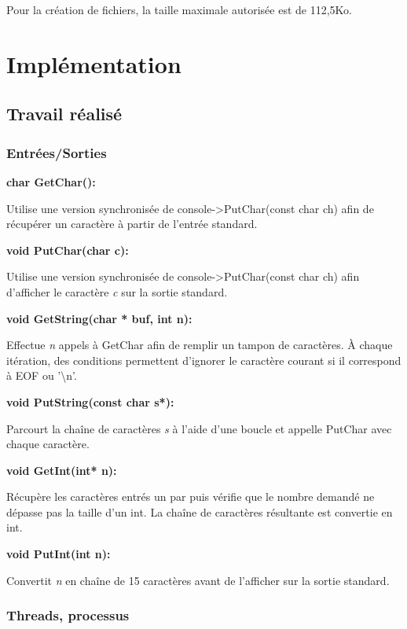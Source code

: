 \documentclass[12pt]{report}
\begin{document}
Pour la création de fichiers, la taille maximale autorisée est de 112,5Ko.


\chapter{Implémentation}

\section{Travail réalisé}

\subsection{Entrées/Sorties}

\textbf{char GetChar():} 

Utilise une version synchronisée de console->PutChar(const char ch)
afin de récupérer un caractère à partir de l'entrée standard.

\bigskip

\textbf{void PutChar(char c):} 

Utilise une version synchronisée de console->PutChar(const char ch)
afin d'afficher le caractère \textit{c} sur la sortie standard.
\bigskip


\textbf{void GetString(char * buf, int n):} 

Effectue \textit{n} appels à GetChar afin de remplir un tampon de caractères.
À chaque itération, des conditions permettent d'ignorer le caractère courant si
il correspond à EOF ou '\textbackslash n'.

\bigskip

\textbf{void PutString(const char s*):}

Parcourt la chaîne de caractères \textit{s} à l'aide d'une boucle et appelle PutChar avec chaque caractère.
\bigskip	
	

\textbf{void GetInt(int* n):}	
	
Récupère les caractères entrés un par puis vérifie que le nombre demandé ne dépasse pas la taille d'un int.
La chaîne de caractères résultante est convertie en int.
\bigskip


\textbf{void PutInt(int n):}

Convertit \textit{n} en chaîne de 15 caractères avant de l'afficher sur la sortie standard.
\bigskip	


\subsection{Threads, processus}
\end{document}
